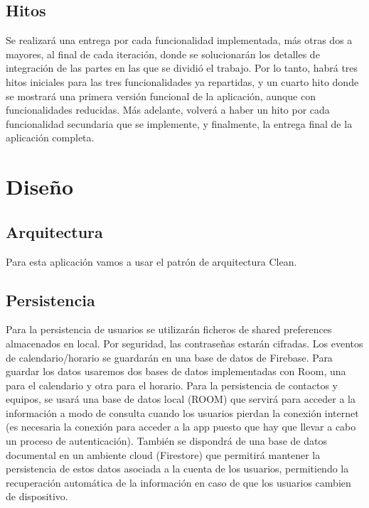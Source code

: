 \documentclass[a4paper,openright,12pt]{article}
\begin{document}
\subsection{Hitos}
Se realizará una entrega por cada funcionalidad implementada, más otras dos a mayores, al final de cada iteración, donde se solucionarán los detalles de integración de las partes en las que se dividió el trabajo. Por lo tanto, habrá tres hitos iniciales para las tres funcionalidades ya repartidas, y un cuarto hito donde se mostrará una primera versión funcional de la aplicación, aunque con funcionalidades reducidas. Más adelante, volverá a haber un hito por cada funcionalidad secundaria que se implemente, y finalmente, la entrega final de la aplicación completa.



\section{Diseño}

\subsection{Arquitectura}
Para esta aplicación vamos a usar el patrón de arquitectura Clean.

\subsection{Persistencia}
Para la persistencia de usuarios se utilizarán ficheros de shared preferences almacenados en local. Por seguridad, las contraseñas estarán cifradas. Los eventos de calendario/horario se guardarán en una base de datos de Firebase. Para guardar los datos usaremos dos bases de datos implementadas con Room, una para el calendario y otra para el horario.
Para la persistencia de contactos y equipos, se usará una base de datos local (ROOM) que servirá para acceder a la información a modo de consulta cuando los usuarios pierdan la conexión internet (es necesaria la conexión para acceder a la app puesto que hay que llevar a cabo un proceso de autenticación). También se dispondrá de una base de datos documental en un ambiente cloud (Firestore) que permitirá mantener la persistencia de estos datos asociada a la cuenta de los usuarios, permitiendo la recuperación automática de la información en caso de que los usuarios cambien de dispositivo.
\end{document}
